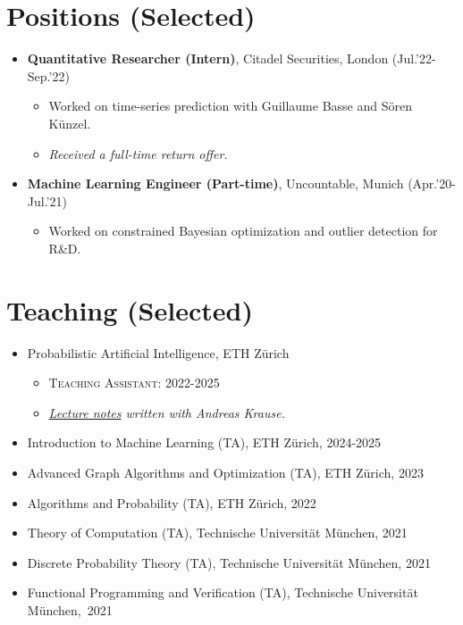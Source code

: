 \documentclass[a4paper,11pt]{article}
\begin{document}
\section*{Positions (Selected)}
\begin{itemize}[leftmargin=1.5em]
  \item \textbf{Quantitative Researcher (Intern)}, Citadel Securities, London (Jul.'22-Sep.'22) \begin{itemize}
    \item Worked on time-series prediction with Guillaume Basse and Sören Künzel.
    \item \emph{Received a full-time return offer.}
  \end{itemize}
  \item \textbf{Machine Learning Engineer (Part-time)}, Uncountable, Munich (Apr.'20-Jul.'21) \begin{itemize}
    \item Worked on constrained Bayesian optimization and outlier detection for R\&D.
  \end{itemize}
\end{itemize}

\section*{Teaching (Selected)}
\begin{itemize}[leftmargin=1.5em]
  \item {Probabilistic Artificial Intelligence}, ETH Zürich \begin{itemize}
    \item \textsc{Teaching Assistant:} 2022-2025
    \item \emph{\href{https://arxiv.org/pdf/2502.05244}{Lecture notes} written with Andreas Krause.}
  \end{itemize}
  \item {Introduction to Machine Learning (TA)}, ETH Zürich, 2024-2025
  \item {Advanced Graph Algorithms and Optimization (TA)}, ETH Zürich, 2023
  \item {Algorithms and Probability (TA)}, ETH Zürich, 2022
  \item {Theory of Computation (TA)}, Technische Universität München, 2021
  \item {Discrete Probability Theory (TA)}, Technische Universität München, 2021
  \item {Functional Programming and Verification (TA)}, Technische Universität München,~2021
\end{itemize}
\end{document}
